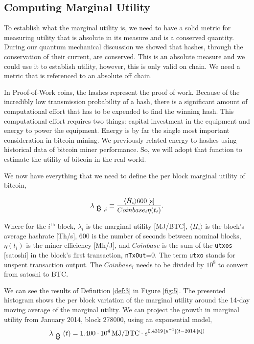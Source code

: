 \documentclass[runningheads]{llncs}
\def\bitcoin{
    \leavevmode
    \vtop{\offinterlineskip %
    \setbox0=\hbox{B}
    \setbox2=\hbox to\wd0{\hfil\hskip-.03em
    \vrule height .3ex width .15ex\hskip .08em
    \vrule height .3ex width .15ex\hfil}
    \vbox{\copy2\box0}\box2}
}
\begin{document}
\subsection{Computing Marginal Utility}\label{sect:3.2}
To establish what the marginal utility is, we need to have a solid metric for measuring utility that is absolute in its measure and is a conserved quantity.
During our quantum mechanical discussion we showed that hashes, through the conservation of their current, are conserved.
This is an absolute measure and we could use it to establish utility, however, this is only valid on chain.
We need a metric that is referenced to an absolute off chain.

In Proof-of-Work coins, the hashes represent the proof of work.
Because of the incredibly low transmission probability of a hash, there is a significant amount of computational effort that has to be expended to find the winning hash.
This computational effort requires two things: capital investment in the equipment and energy to power the equipment.
Energy is by far the single most important consideration in bitcoin mining.
We previously related energy to hashes using historical data of bitcoin miner performance.
So, we will adopt that function to estimate the utility of bitcoin in the real world.

We now have everything that we need to define the per block marginal utility of bitcoin,
\begin{definition}\label{def:3}
    \begin{equation}
        \lambda_{\mbox{\bitcoin},i} \equiv \frac{\langle \dot{H}_i \rangle  600\,[\mathrm{s}]}{Coinbase_i \eta(t_i)}.\label{eq:9}
    \end{equation}
\end{definition}
Where for the $i^{\mbox{th}}$ block, $\lambda_i$ is the marginal utility [MJ/BTC], $\langle \dot{H}_i \rangle$ is the block's average hashrate [Th/s], 600 is the number of seconds between nominal blocks, $\eta(t_i)$ is the miner efficiency [Mh/J], and $Coinbase$ is the sum of the {\tt utxos} [satoshi] in the block's first transaction, {\tt nTxOut}=0.
The term {\tt utxo} stands for unspent transaction output. The $Coinbase_i$ needs to be divided by $10^8$ to convert from satoshi to BTC.

We can see the results of Definition \ref{def:3} in Figure \ref{fig:5}.
The presented histogram shows the per block variation of the marginal utility around the 14-day moving average of the marginal utility.
We can project the growth in marginal utility from January 2014, block 278000, using an exponential model,
\begin{equation}
    \lambda_{\mbox{\bitcoin}}(t) = 1.400\cdot 10^4 \, \textrm{MJ/BTC} \cdot e^{0.4319 \,[\textrm{a}^{-1}] (t - 2014\,[\textrm{a}])}\label{eq:15}
\end{equation}
\end{document}
